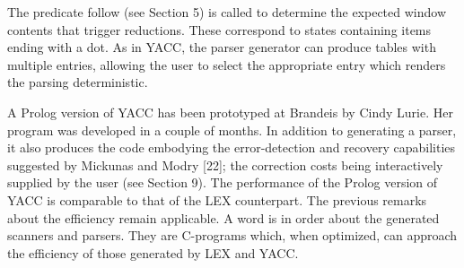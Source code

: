 The predicate follow (see Section 5) is called to determine the expected window
contents that trigger reductions. These correspond to states containing items
ending with a dot. As in YACC, the parser generator can produce tables with
multiple entries, allowing the user to select the appropriate entry which renders
the parsing deterministic. 

A Prolog version of YACC has been prototyped at Brandeis by Cindy Lurie.
Her program was developed in a couple of months. In addition to generating a
parser, it also produces the code embodying the error-detection and recovery
capabilities suggested by Mickunas and Modry [22]; the correction costs being
interactively supplied by the user (see Section 9). The performance of the Prolog
version of YACC is comparable to that of the LEX counterpart. The previous
remarks about the efficiency remain applicable. A word is in order about the
generated scanners and parsers. They are C-programs which, when optimized,
can approach the efficiency of those generated by LEX and YACC. 

 